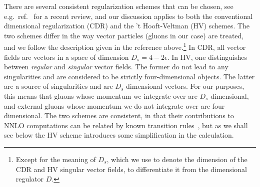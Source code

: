 There are several consistent regularization schemes that can be
chosen, see
e.g.\ ref.~\cite{Gnendiger:2017pys} for a recent review, and our
discussion applies to both the conventional
dimensional regularization (CDR) and the 't Hooft-Veltman (HV)
schemes. The two schemes differ in the way
vector particles (gluons in our case) are treated,
and we follow 
the description given in the reference
above.\footnote{Except for the meaning of $D_s$, which we use 
to denote the dimension of the CDR and HV singular vector 
fields, to differentiate it from the dimensional regulator $D$.}
In CDR, all vector fields are vectors in a space of dimension
$D_s=4-2\epsilon$. In
HV, one distinguishes between \emph{regular} and 
\emph{singular} vector 
fields. The former do not lead to any singularities and 
are considered to be
strictly four-dimensional objects. The
latter are a source of singularities and are 
$D_s$-dimensional vectors. For our purposes, this means
that gluons whose momentum we integrate over are 
$D_s$ dimensional, and external gluons whose momentum
we do not integrate over are
four dimensional. The two schemes are consistent,
in that their contributions to NNLO computations can be related by known
transition rules~\cite{Broggio:2015dga}, but as we
shall see below the HV scheme introduces some simplification in
the calculation.


